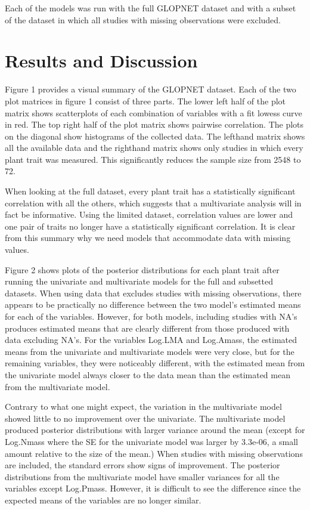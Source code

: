 \documentclass[12pt,fleqn]{article}
\begin{document}
\noindent Each of the models was run with the full GLOPNET dataset and with a subset of the dataset in which all studies with missing observations were excluded. 


\section{Results and Discussion}

Figure 1 provides a visual summary of the GLOPNET dataset. Each of the two plot matrices in figure 1 consist of three parts. The lower left half of the plot matrix shows scatterplots of each combination of variables with  a fit lowess curve in red. The top right half of the plot matrix shows pairwise correlation. The plots on the diagonal show histograms of the collected data. The lefthand matrix shows all the available data and the righthand matrix shows only studies in which every plant trait was measured. This significantly reduces the sample size from 2548 to 72. 

When looking at the full dataset, every plant trait has a statistically significant correlation with all the others, which suggests that a multivariate analysis will in fact be informative. Using the limited dataset, correlation values are lower and one pair of traits no longer have a statistically significant correlation. It is clear from this summary why we need models that accommodate data with missing values. 

Figure 2 shows plots of the posterior distributions for each plant trait after running the univariate and multivariate models for the full and subsetted datasets. When using data that excludes studies with missing observations, there appears to be practically no difference between the two model’s estimated means for each of the variables. However, for both models, including studies with NA’s produces estimated means that are clearly different from those produced with data excluding NA’s. For the variables Log.LMA and Log.Amass, the estimated means from the univariate and multivariate models were very close, but for the remaining variables, they were noticeably different, with the estimated mean from the univariate model always closer to the data mean than the estimated mean from the multivariate model.

Contrary to what one might expect, the variation in the multivariate model showed little to no improvement over the univariate.  The multivariate model produced posterior distributions with larger variance around the mean (except for Log.Nmass where the SE for the univariate model was larger by 3.3e-06, a small amount relative to the size of the mean.) When studies with missing observations are included, the standard errors show signs of improvement. The posterior distributions from the multivariate model have smaller variances for all the variables except Log.Pmass. However, it is difficult to see the difference since the expected means of the variables are no longer similar.
\end{document}
